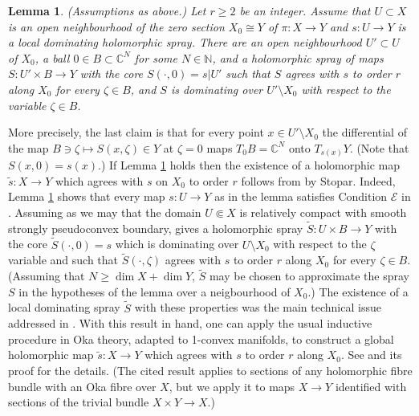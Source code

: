 \documentclass[12pt]{amsart}
\newtheorem{lemma}[theorem]{Lemma}
\theoremstyle{definition}
\numberwithin{equation}{section}
\numberwithin{figure}{section}
\newcommand\Ecal{\mathcal{E}}
\newcommand\C{\mathbb{C}}
\newcommand\N{\mathbb{N}}
\newcommand\wt{\widetilde}
\numberwithin{equation}{section}
\begin{document}
%
%
\begin{lemma}\label{lem:localspray}
(Assumptions as above.) Let $r\ge 2$ be an integer.
Assume that $U\subset X$ is an open neighbourhood of 
the zero section $X_0\cong Y$ of $\pi:X\to Y$ 
and $s:U\to Y$ is a local dominating holomorphic spray.
There are an open neighbourhood $U'\subset U$ 
of $X_0$, a ball $0\in B\subset \C^N$ for some $N\in\N$, 
and a holomorphic spray of maps
$S:U'\times B \to Y$ with the core $S(\cdotp,0)=s|U'$
such that $S$ agrees with $s$ to order $r$ along $X_0$ for every 
$\zeta\in B$, and $S$ is dominating over $U'\setminus X_0$
with respect to the variable $\zeta \in B$.
\end{lemma}

More precisely, the last claim is that for every point 
$x\in U'\setminus X_0$ the differential of the map 
$B\ni \zeta \mapsto S(x,\zeta)\in Y$ at $\zeta =0$
maps $T_0 B =\C^N$ onto $T_{s(x)}Y$.
(Note that $S(x,0)=s(x)$.) 
%
If Lemma \ref{lem:localspray} holds then  
the existence of a holomorphic map $\tilde s:X\to Y$ which agrees
with $s$ on $X_0$ to order $r$ follows from 
\cite[Theorem 3.3]{Stopar2013} by Stopar. 
Indeed, Lemma \ref{lem:localspray} shows that 
every map $s:U\to Y$ as in the lemma
satisfies Condition $\Ecal$ in \cite[p.\ 4]{Stopar2013}. 
Assuming as we may that the domain $U\Subset X$ is 
relatively compact with smooth strongly pseudoconvex boundary, 
\cite[Theorem 2.5]{Stopar2013} gives  
a holomorphic spray $\wt S:U\times B\to Y$ with the
core $\wt S(\cdotp,0)=s$ which is dominating over $U\setminus X_0$ 
with respect to the $\zeta$ variable and such that 
$\wt S(\cdotp,\zeta)$ agrees with $s$ to order $r$ 
along $X_0$ for every $\zeta\in B$. 
(Assuming that $N\ge \dim X+\dim Y$, $\wt S$ may be chosen to approximate the spray $S$ in the hypotheses of the lemma over a neigbourhood of $X_0$.) 
The existence of a local dominating spray $\wt S$ with these properties was 
the main technical issue addressed in \cite{Prezelj2010,Prezelj2016}. 
With this result in hand, one can apply the usual inductive procedure 
in Oka theory, adapted to 1-convex manifolds, 
to construct a global holomorphic map $\tilde s:X \to Y$ which agrees 
with $s$ to order $r$ along $X_0$. See \cite[Theorem 3.3]{Stopar2013}
and its proof for the details. (The cited result applies 
to sections of any holomorphic fibre bundle with an Oka fibre over $X$,
but we apply it to maps $X\to Y$ identified with sections of the 
trivial bundle $X\times Y\to X$.)
\end{document}
